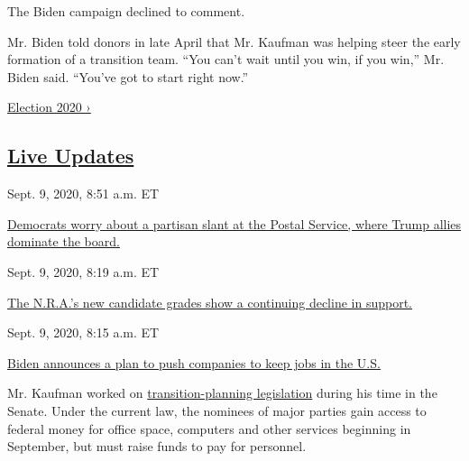 The Biden campaign declined to comment.

Mr. Biden told donors in late April that Mr. Kaufman was helping steer
the early formation of a transition team. ``You can't wait until you
win, if you win,'' Mr. Biden said. ``You've got to start right now.''

\href{https://www.nytimes3xbfgragh.onion/news-event/2020-election}{Election
2020 ›}

\hypertarget{live-updates}{%
\subsection{\texorpdfstring{\href{https://www.nytimes3xbfgragh.onion/live/2020/09/09/us/trump-vs-biden}{Live
Updates}}{Live Updates}}\label{live-updates}}

\href{https://www.nytimes3xbfgragh.onion/live/2020/09/09/us/trump-vs-biden\#democrats-worry-about-a-partisan-slant-at-the-postal-service-where-trump-allies-dominate-the-board}{}

Sept. 9, 2020, 8:51 a.m. ET

\href{https://www.nytimes3xbfgragh.onion/live/2020/09/09/us/trump-vs-biden\#democrats-worry-about-a-partisan-slant-at-the-postal-service-where-trump-allies-dominate-the-board}{Democrats
worry about a partisan slant at the Postal Service, where Trump allies
dominate the
board.}\href{https://www.nytimes3xbfgragh.onion/live/2020/09/09/us/trump-vs-biden\#the-nras-new-candidate-grades-show-a-continuing-decline-in-support}{}

Sept. 9, 2020, 8:19 a.m. ET

\href{https://www.nytimes3xbfgragh.onion/live/2020/09/09/us/trump-vs-biden\#the-nras-new-candidate-grades-show-a-continuing-decline-in-support}{The
N.R.A.'s new candidate grades show a continuing decline in
support.}\href{https://www.nytimes3xbfgragh.onion/live/2020/09/09/us/trump-vs-biden\#biden-announces-a-plan-to-push-companies-to-keep-jobs-in-the-us}{}

Sept. 9, 2020, 8:15 a.m. ET

\href{https://www.nytimes3xbfgragh.onion/live/2020/09/09/us/trump-vs-biden\#biden-announces-a-plan-to-push-companies-to-keep-jobs-in-the-us}{Biden
announces a plan to push companies to keep jobs in the U.S.}

Mr. Kaufman worked on
\href{https://www.govexec.com/management/2016/03/obama-signs-bipartisan-bill-smooth-presidential-transition/126820/}{transition-planning
legislation} during his time in the Senate. Under the current law, the
nominees of major parties gain access to federal money for office space,
computers and other services beginning in September, but must raise
funds to pay for personnel.

